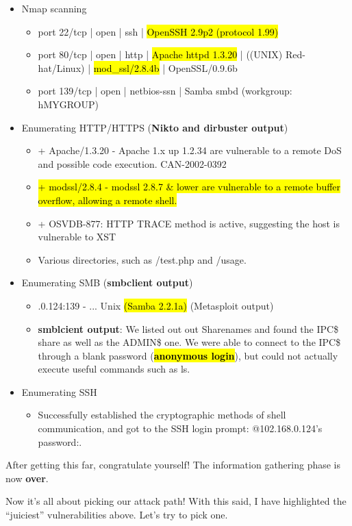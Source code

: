 \documentclass[a4paper,11pt]{article}
\renewcommand{\tt}[2][tt]{\textcolor{#1}{\ttfamily #2}}%
\begin{document}
\begin{itemize}
    \item Nmap scanning
    \begin{itemize}
        \item \tt{port 22/tcp | open | ssh | \hl{OpenSSH 2.9p2 (protocol 1.99)}}
        \item \tt{port 80/tcp | open | http | \hl{Apache httpd 1.3.20} | ((UNIX) Red-hat/Linux) | \hl{mod\_ssl/2.8.4b} | OpenSSL/0.9.6b}
        \item \tt{port 139/tcp | open | netbios-ssn | Samba smbd (workgroup: hMYGROUP)}
    \end{itemize}
    \item Enumerating HTTP/HTTPS ({\bfseries Nikto and dirbuster output})
    \begin{itemize}
        \item \tt{+ Apache/1.3.20 - Apache 1.x up 1.2.34 are vulnerable to a remote DoS and possible code execution. CAN-2002-0392}
        \item \tt{\hl{+ modssl/2.8.4 - modssl 2.8.7 \& lower are vulnerable to a remote buffer overflow, allowing a remote shell.}}
        \item \tt{+ OSVDB-877: HTTP TRACE method is active, suggesting the host is vulnerable to XST}
        \item Various directories, such as \tt{/test.php} and \tt{/usage}.
    \end{itemize}
    \item Enumerating SMB ({\bfseries smbclient output})
    \begin{itemize}
            \item \tt{[*] 192.168.0.124:139 - ... Unix \hl{(Samba 2.2.1a)}} (Metasploit output)
        \item {\bfseries smblcient output}: We listed out out \tt{Sharenames} and found the \tt{IPC\$} share as well as the \tt{ADMIN\$} one. We were able to connect to the \tt{IPC\$} through a blank password ({\bfseries \hl{anonymous login}}), but could not actually execute useful commands such as \tt{ls}.
    \end{itemize}
    \item Enumerating SSH
    \begin{itemize}
        \item Successfully established the cryptographic methods of shell communication, and got to the SSH login prompt: \tt{<your username>@102.168.0.124's password:}. 
    \end{itemize}
\end{itemize}
\begin{center}
\vspace{2cm}
After getting this far, congratulate yourself! The information gathering phase is now {\bfseries over}. 

Now it's all about picking our attack path! With this said, I have highlighted the ``juiciest'' vulnerabilities above. Let's try to pick one.
\end{center}
\pagebreak
\end{document}
